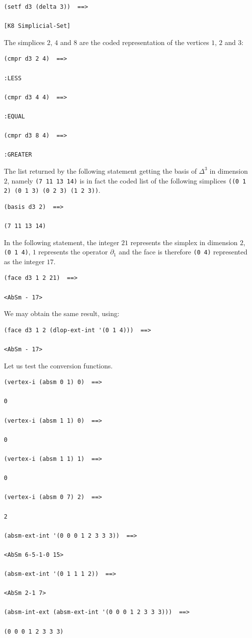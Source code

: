 {\footnotesize\begin{verbatim}
(setf d3 (delta 3))  ==>

[K8 Simplicial-Set]
\end{verbatim}}
The simplices $2$, $4$ and  $8$ are the coded representation of the vertices $1$, $2$ and $3$:
{\footnotesize\begin{verbatim}
(cmpr d3 2 4)  ==>

:LESS

(cmpr d3 4 4)  ==>

:EQUAL

(cmpr d3 8 4)  ==>

:GREATER
\end{verbatim}}
The list returned by the following statement  getting the basis of $\Delta^3$ in 
dimension $2$, namely {\tt (7 11 13 14)} is in fact the coded list 
of the following simplices {\tt ((0 1 2) (0 1 3) (0 2 3) (1 2 3))}. 
{\footnotesize\begin{verbatim}
(basis d3 2)  ==>

(7 11 13 14)
\end{verbatim}}
In the following statement, 
the integer $21$ represents the simplex in dimension $2$, {\tt (0 1 4)}, $1$ represents the operator $\partial_1$
and the face is therefore {\tt (0 4)} represented as the integer $17$. 
{\footnotesize\begin{verbatim}
(face d3 1 2 21)  ==>

<AbSm - 17>
\end{verbatim}}
We may obtain the same result, using:
{\footnotesize\begin{verbatim}
(face d3 1 2 (dlop-ext-int '(0 1 4)))  ==>

<AbSm - 17>
\end{verbatim}}
Let us test the conversion functions.
{\footnotesize\begin{verbatim}
(vertex-i (absm 0 1) 0)  ==>

0

(vertex-i (absm 1 1) 0)  ==>

0

(vertex-i (absm 1 1) 1)  ==>

0

(vertex-i (absm 0 7) 2)  ==>

2

(absm-ext-int '(0 0 0 1 2 3 3 3))  ==>

<AbSm 6-5-1-0 15>

(absm-ext-int '(0 1 1 1 2))  ==>

<AbSm 2-1 7>

(absm-int-ext (absm-ext-int '(0 0 0 1 2 3 3 3)))  ==>

(0 0 0 1 2 3 3 3)
\end{verbatim}}

